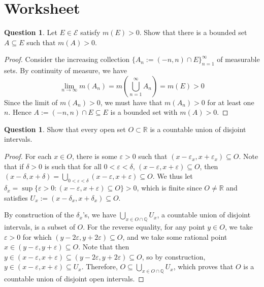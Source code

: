 \documentclass{article}
\newcommand{\Q}{\mathbb{Q}}
\newcommand{\R}{\mathbb{R}}
\theoremstyle{definition} %
\numberwithin{thm}{section} %
\theoremstyle{definition} %
\newtheorem{question}[thm]{Question}
\begin{document}
\section{Worksheet}

\begin{question}
Let $E \in \mathcal{E}$ satisfy $m(E) > 0$. Show that there is a bounded set $A \subseteq E$ such that $m(A) > 0$.
\end{question}
\begin{proof}
Consider the increasing collection ${\{A_n := (-n, n) \cap E\}}_{n = 1}^\infty$ of measurable sets. By continuity of measure, we have
\[ \lim_{n \to \infty} m(A_n) = m\left(\bigcup_{n = 1}^\infty A_n\right) = m(E) > 0 \]
Since the limit of $m(A_n) > 0$, we must have that $m(A_n) > 0$ for at least one $n$. Hence $A := (-n, n) \cap E \subseteq E$ is a bounded set with $m(A) > 0$.
\end{proof}

\begin{question}
Show that every open set $O \subset \mathbb{R}$ is a countable union of disjoint intervals.
\end{question}
\begin{proof}
For each $x \in O$, there is some $\varepsilon > 0$ such that $(x - \varepsilon_x, x + \varepsilon_x) \subseteq O$. Note that if $\delta > 0$ is such that for all $0 < \varepsilon < \delta$, $(x - \varepsilon, x + \varepsilon) \subseteq O$, then $(x - \delta, x + \delta) = \bigcup_{0 < \varepsilon < \delta} (x - \varepsilon, x + \varepsilon) \subseteq O$. We thus let $\delta_x = \sup\{\varepsilon > 0: (x - \varepsilon, x + \varepsilon) \subseteq O\} > 0$, which is finite since $O \neq \R$ and satisfies $U_x := (x - \delta_x, x + \delta_x) \subseteq O$.

By construction of the $\delta_x$'s, we have $\bigcup_{x \in O \cap \Q} U_x$, a countable union of disjoint intervals, is a subset of $O$. For the reverse equality, for any point $y \in O$, we take $\varepsilon > 0$ for which $(y - 2\varepsilon, y + 2\varepsilon) \subseteq O$, and we take some rational point $x \in (y - \varepsilon, y + \varepsilon) \subseteq O$. Note that then $y \in (x - \varepsilon, x + \varepsilon) \subseteq (y - 2\varepsilon, y + 2\varepsilon) \subseteq O$, so by construction, $y \in (x - \varepsilon, x + \varepsilon) \subseteq U_x$. Therefore, $O \subseteq \bigcup_{x \in O \cap \Q} U_x$, which proves that $O$ is a countable union of disjoint open intervals.
\end{proof}
\end{document}

